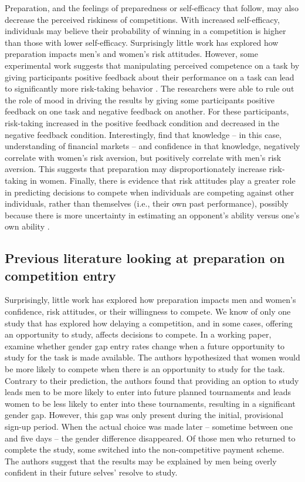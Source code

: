 \documentclass[a4paper, nobind]{templates/ociamthesis}
\begin{document}
Preparation, and the feelings of preparedness or self-efficacy that follow, may also decrease the perceived riskiness of competitions. With increased self-efficacy, individuals may believe their probability of winning in a competition is higher than those with lower self-efficacy. Surprisingly little work has explored how preparation impacts men's and women's risk attitudes. However, some experimental work suggests that manipulating perceived competence on a task by giving participants positive feedback about their performance on a task can lead to significantly more risk-taking behavior \autocite{Krueger1994}. The researchers were able to rule out the role of mood in driving the results by giving some participants positive feedback on one task and negative feedback on another. For these participants, risk-taking increased in the positive feedback condition and decreased in the negative feedback condition. Interestingly, \textcite{Gysler2002} find that knowledge -- in this case, understanding of financial markets -- and confidence in that knowledge, negatively correlate with women's risk aversion, but positively correlate with men's risk aversion. This suggests that preparation may disproportionately increase risk-taking in women. Finally, there is evidence that risk attitudes play a greater role in predicting decisions to compete when individuals are competing against other individuals, rather than themselves (i.e., their own past performance), possibly because there is more uncertainty in estimating an opponent's ability versus one's own ability \autocite{Apicella2017a}.

\hypertarget{previous-literature-looking-at-preparation-on-competition-entry}{%
\subsection{Previous literature looking at preparation on competition entry}\label{previous-literature-looking-at-preparation-on-competition-entry}}

Surprisingly, little work has explored how preparation impacts men and women's confidence, risk attitudes, or their willingness to compete. We know of only one study that has explored how delaying a competition, and in some cases, offering an opportunity to study, affects decisions to compete. In a working paper, \textcite{Charness2021} examine whether gender gap entry rates change when a future opportunity to study for the task is made available. The authors hypothesized that women would be more likely to compete when there is an opportunity to study for the task. Contrary to their prediction, the authors found that providing an option to study leads men to be more likely to enter into future planned tournaments and leads women to be less likely to enter into these tournaments, resulting in a significant gender gap. However, this gap was only present during the initial, provisional sign-up period. When the actual choice was made later -- sometime between one and five days -- the gender difference disappeared. Of those men who returned to complete the study, some switched into the non-competitive payment scheme. The authors suggest that the results may be explained by men being overly confident in their future selves' resolve to study.
\end{document}
